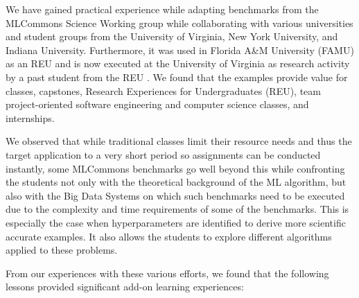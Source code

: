 \documentclass[utf8]{FrontiersinVancouver} %
\begin{document}
We have gained practical experience while adapting benchmarks from the
MLCommons Science Working group while collaborating with various
universities and student groups from the University of Virginia, New
York University, and Indiana University. Furthermore, it was used in
Florida A\&M University (FAMU) as an REU and is now executed at the
University of Virginia as research activity by a past student from the
REU \cite{las-2022-mdpi-crypto}. We found that the examples provide
value for classes, capstones, Research Experiences for Undergraduates
(REU), team project-oriented software engineering and computer science
classes, and internships.

We observed that while traditional classes limit their resource needs
and thus the target application to a very short period so assignments
can be conducted instantly, some MLCommons benchmarks go well beyond
this while confronting the students not only with the theoretical
background of the ML algorithm, but also with the Big Data Systems on
which such benchmarks need to be executed due to the complexity and
time requirements of some of the benchmarks. This is especially the
case when hyperparameters are identified to derive more scientific
accurate examples. It also allows the students to explore different
algorithms applied to these problems.

From our experiences with these various efforts, we found that the
following lessons provided significant add-on learning experiences:
\end{document}
